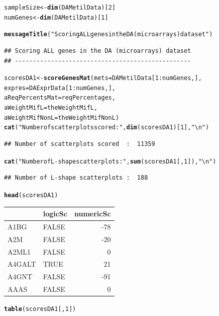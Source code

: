 \documentclass[a4paper,10pt]{article}\usepackage[]{graphicx}\usepackage[]{color}
\makeatletter
\newcommand{\hlnum}[1]{\textcolor[rgb]{0.686,0.059,0.569}{#1}}%
\newcommand{\hlstr}[1]{\textcolor[rgb]{0.192,0.494,0.8}{#1}}%
\newcommand{\hlopt}[1]{\textcolor[rgb]{0,0,0}{#1}}%
\newcommand{\hlstd}[1]{\textcolor[rgb]{0.345,0.345,0.345}{#1}}%
\newcommand{\hlkwb}[1]{\textcolor[rgb]{0.69,0.353,0.396}{#1}}%
\newcommand{\hlkwc}[1]{\textcolor[rgb]{0.333,0.667,0.333}{#1}}%
\newcommand{\hlkwd}[1]{\textcolor[rgb]{0.737,0.353,0.396}{\textbf{#1}}}%
\newenvironment{kframe}{%
 \def\at@end@of@kframe{}%
 \ifinner\ifhmode%
  \def\at@end@of@kframe{\end{minipage}}%
  \begin{minipage}{\columnwidth}%
 \fi\fi%
 \def\FrameCommand##1{\hskip\@totalleftmargin \hskip-\fboxsep
 \colorbox{shadecolor}{##1}\hskip-\fboxsep
     \hskip-\linewidth \hskip-\@totalleftmargin \hskip\columnwidth}%
 \MakeFramed {\advance\hsize-\width
   \@totalleftmargin\z@ \linewidth\hsize
   \@setminipage}}%
 {\par\unskip\endMakeFramed%
 \at@end@of@kframe}
\newenvironment{knitrout}{}{} %
\makeatother
\begin{document}
\begin{knitrout}
\color{fgcolor}\begin{kframe}
\begin{alltt}
\hlstd{sampleSize} \hlkwb{<-} \hlkwd{dim}\hlstd{(DAMetilData)[}\hlnum{2}\hlstd{]}
\hlstd{numGenes} \hlkwb{<-}   \hlkwd{dim}\hlstd{(DAMetilData)[}\hlnum{1}\hlstd{]}

\hlkwd{messageTitle}\hlstd{(}\hlstr{"Scoring ALL genes in the DA (microarrays) dataset"}\hlstd{)}
\end{alltt}
\begin{verbatim}
## Scoring ALL genes in the DA (microarrays) dataset 
## -------------------------------------------------
\end{verbatim}
\begin{alltt}
\hlstd{scoresDA1} \hlkwb{<-} \hlkwd{scoreGenesMat} \hlstd{(}\hlkwc{mets}\hlstd{=DAMetilData[}\hlnum{1}\hlopt{:}\hlstd{numGenes,],}
                                                        \hlkwc{expres}\hlstd{=DAExprData[}\hlnum{1}\hlopt{:}\hlstd{numGenes,],}
                            \hlkwc{aReqPercentsMat}\hlstd{=reqPercentages,}
                            \hlkwc{aWeightMifL}\hlstd{=theWeightMifL,}
                            \hlkwc{aWeightMifNonL}\hlstd{=theWeightMifNonL )}
\hlkwd{cat}\hlstd{(}\hlstr{"Number of scatterplots scored  : "}\hlstd{,} \hlkwd{dim}\hlstd{(scoresDA1)[}\hlnum{1}\hlstd{],}\hlstr{"\textbackslash{}n"}\hlstd{)}
\end{alltt}
\begin{verbatim}
## Number of scatterplots scored  :  11359
\end{verbatim}
\begin{alltt}
\hlkwd{cat}\hlstd{(}\hlstr{"Number of L-shape scatterplots : "}\hlstd{,} \hlkwd{sum}\hlstd{(scoresDA1[,}\hlnum{1}\hlstd{]),}\hlstr{"\textbackslash{}n"}\hlstd{)}
\end{alltt}
\begin{verbatim}
## Number of L-shape scatterplots :  188
\end{verbatim}
\begin{alltt}
\hlkwd{head}\hlstd{(scoresDA1)}
\end{alltt}
\end{kframe}


\begin{tabular}{l|l|r}
\hline
  & logicSc & numericSc\\
\hline
A1BG & FALSE & -78\\
\hline
A2M & FALSE & -20\\
\hline
A2ML1 & FALSE & 0\\
\hline
A4GALT & TRUE & 21\\
\hline
A4GNT & FALSE & -91\\
\hline
AAAS & FALSE & 0\\
\hline
\end{tabular}\begin{kframe}\begin{alltt}
\hlkwd{table}\hlstd{(scoresDA1[,}\hlnum{1}\hlstd{])}
\end{alltt}
\end{kframe}



\end{knitrout}
\end{document}

